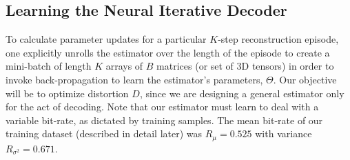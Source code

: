 \documentclass[smallabstract,smallcaptions]{dccpaper}
\begin{document}


\subsection{Learning the Neural Iterative Decoder}
\label{sec:learning}
To calculate parameter updates for a particular $K$-step reconstruction episode, one explicitly unrolls the estimator over the length of the episode to create a mini-batch of length $K$ arrays of $B$ matrices (or set of 3D tensors) in order to invoke back-propagation to learn the estimator's parameters, $\Theta$. 
Our objective will be to optimize distortion $D$, since we are designing a general estimator only for the act of decoding. Note that our estimator must learn to deal with a variable bit-rate, as dictated by training samples.  
The mean bit-rate of our training dataset (described in detail later) was $R_\mu = 0.525$ with variance $R_{\sigma^2} = 0.671$. %
\end{document}
